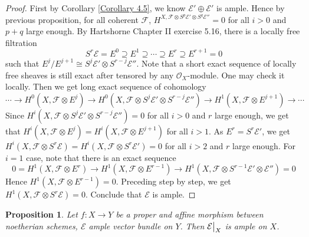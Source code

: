\documentclass{ctexart}
\newtheorem{proposition}{Proposition}[section]
\begin{document}
\begin{proof}
    First by Corollary \ref{Corollary 4.5}, we know $\mathcal{E}' \oplus \mathcal{E}'$ is ample.
    Hence by previous proposition, for all coherent $\mathcal{F}$,
    $H^{X, \mathcal{F} \otimes S^{p}\mathcal{E}' \otimes S^{q}\mathcal{E}''} = 0$ for all $i > 0$ and $p + q$ large enough.
    By Hartshorne Chapter II exercise 5.16, there is a locally free filtration
    \begin{equation}
        S^{r}\mathcal{E} = E^{0} \supseteq E^{1} \supseteq \cdots \supseteq E^{r} \supseteq E^{r + 1} = 0
    \end{equation}
    such that $E^{j}/E^{j + 1} \cong S^{j}\mathcal{E}' \otimes S^{r - j}\mathcal{E}''$.
    Note that a short exact sequence of locally free sheaves is still exact after tensored by any $\mathcal{O}_{X}$-module.
    One may check it locally.
    Then we get long exact sequence of cohomology
    \begin{equation}
        \cdots \rightarrow H^{0}(X, \mathcal{F} \otimes E^{j}) \rightarrow H^{0}(X, \mathcal{F} \otimes S^{j}\mathcal{E}' \otimes S^{r - j}\mathcal{E}'') \rightarrow H^{1}(X, \mathcal{F} \otimes E^{j + 1}) \rightarrow \cdots
    \end{equation}
    Since $H^{i}(X, \mathcal{F} \otimes S^{j}\mathcal{E}' \otimes S^{r - j}\mathcal{E}'') = 0$ for all $i > 0$ and $r$ large enough,
    we get that $H^{i}(X, \mathcal{F} \otimes E^{j}) = H^{i}(X, \mathcal{F} \otimes E^{j + 1})$ for all $i > 1$.
    As $E^{r} = S^{r}\mathcal{E}'$, we get $H^{i}(X, \mathcal{F} \otimes S^{r}\mathcal{E}) = H^{i}(X, \mathcal{F} \otimes S^{r}\mathcal{E}') = 0$ for all $i > 2$ and $r$ large enough.
    For $i = 1$ case, note that there is an exact sequence
    \begin{equation}
        0 = H^{1}(X, \mathcal{F} \otimes E^{r}) \rightarrow H^{1}(X, \mathcal{F} \otimes E^{r - 1}) \rightarrow H^{1}(X, \mathcal{F} \otimes S^{r - 1}\mathcal{E}' \otimes \mathcal{E}'') = 0
    \end{equation}
    Hence $H^{1}(X, \mathcal{F} \otimes E^{r - 1}) = 0$.
    Preceding step by step, we get $H^{1}(X, \mathcal{F} \otimes S^{r}\mathcal{E}) = 0$.
    Conclude that $\mathcal{E}$ is ample.
\end{proof}
\begin{proposition}
    Let $f: X \rightarrow Y$ be a proper and affine morphism between noetherian schemes, $\mathcal{E}$ ample vector bundle on $Y$.
    Then $\mathcal{E}\big{|}_{X}$ is ample on $X$.
    \label{Proposition 4.13}
\end{proposition}
\end{document}

